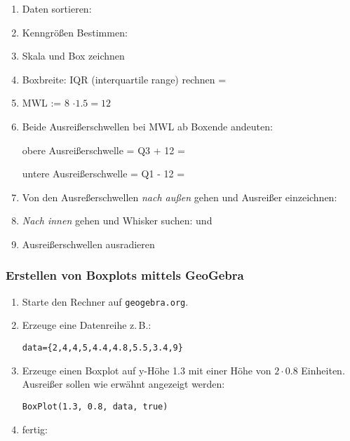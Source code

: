 \begin{enumerate}

\item Daten sortieren: 

\item Kenngrößen Bestimmen: 

\item Skala und Box zeichnen

\item Boxbreite: IQR (interquartile range) rechnen =
\item MWL := 8 $\cdot{} 1.5 = 12$
  
\item Beide Ausreißerschwellen bei MWL ab Boxende andeuten:

  obere Ausreißerschwelle = Q3 + 12 = 

  untere Ausreißerschwelle = Q1 - 12 = 

  \item Von den Ausreßerschwellen \textit{nach außen} gehen und
    Ausreißer einzeichnen: 

  \item \textit{Nach innen} gehen und Whisker suchen:
     und 
    
  \item Ausreißerschwellen ausradieren
\end{enumerate}



\newpage

\subsubsection{Erstellen von Boxplots mittels GeoGebra}
\begin{enumerate}
\item Starte den Rechner auf \texttt{geogebra.org}.
\item Erzeuge eine Datenreihe z.\,B.:

\texttt{data=\{2,4,4,5,4.4,4.8,5.5,3.4,9\}}


\item Erzeuge einen Boxplot auf y-Höhe 1.3 mit einer Höhe von
  $2\cdot{}0.8$ Einheiten. Ausreißer sollen wie erwähnt angezeigt
  werden:

  \texttt{BoxPlot(1.3, 0.8, data, true)}

\item fertig:


  
\end{enumerate}

